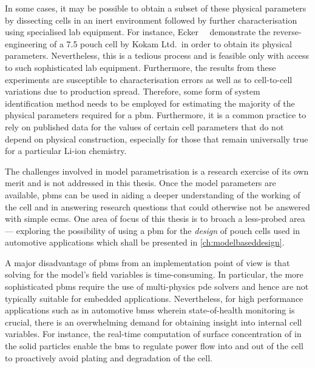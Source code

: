 In  some  cases, it  may  be  possible to  obtain  a  subset of  these  physical
parameters   by  dissecting   cells  in   an  inert   environment  followed   by
further  characterisation   using  specialised  lab  equipment.   For  instance,
Ecker~\etal~\cite{Ecker2015}   demonstrate   the    reverse-engineering   of   a
\SI{7.5}{\amphour} pouch  cell by Kokam  Ltd.\ in  order to obtain  its physical
parameters. Nevertheless,  this is a tedious  process and is feasible  only with
access  to  such sophisticated  lab  equipment.  Furthermore, the  results  from
these  experiments are  susceptible to  characterisation  errors as  well as  to
cell-to-cell variations due to production spread. Therefore, some form of system
identification method  needs to be employed  for estimating the majority  of the
physical  parameters required  for  a  \gls{pbm}. Furthermore,  it  is a  common
practice to  rely on published  data for the  values of certain  cell parameters
that do  not depend on physical  construction, especially for those  that remain
universally true for a particular Li-ion chemistry.

The challenges involved  in model parametrisation is a research  exercise of its
own merit and  is not addressed in  this thesis.  Once  the model parameters are
available, \glspl{pbm} can be used in  aiding a deeper understanding of the
working of  the cell and in answering research  questions that could  otherwise
not be answered  with simple \glspl{ecm}. One area  of focus of this  thesis is
to broach  a less-probed area --- exploring  the possibility  of using  a
\gls{pbm}  for the  \emph{design} of pouch  cells  used  in  automotive 
applications which  shall  be  presented  in \cref{ch:modelbaseddesign}.


A major disadvantage of \glspl{pbm} from an implementation point of view is that
solving for  the model's field  variables is time-consuming. In  particular, the
more  sophisticated  \glspl{pbm}  require  the use  of  multi-physics  \gls{pde}
solvers  and  hence  are  not  typically  suitable  for  embedded  applications.
Nevertheless,  for   high  performance   applications  such  as   in  automotive
\glspl{bms}  wherein   state-of-health  monitoring  is  crucial,   there  is  an
overwhelming  demand for  obtaining insight  into internal  cell variables.  For
instance, the real-time computation of surface concentration of  in the
solid particles enable the \gls{bms} to regulate  power flow into and out of the
cell to proactively avoid plating and degradation of the cell.

